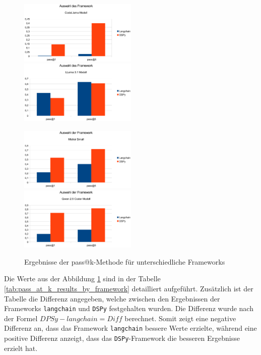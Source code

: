 \begin{figure}[!ht]
	\includegraphics[width=0.5\textwidth]{content/chapter_evaluation/images/framework_evaluation_codellama.eps}
	\includegraphics[width=0.5\textwidth]{content/chapter_evaluation/images/framework_evaluation_llama31.eps}\vspace{1cm}

	\includegraphics[width=0.5\textwidth]{content/chapter_evaluation/images/framework_evaluation_mistral-small.eps}
	\includegraphics[width=0.5\textwidth]{content/chapter_evaluation/images/framework_evaluation_qwen25-coder.eps}
	\caption{Ergebnisse der pass@k-Methode für unterschiedliche Frameworks}
	\label{img:pass_at_k_results_by_framework}
\end{figure}

Die Werte aus der Abbildung \ref{img:pass_at_k_results_by_framework} sind in der Tabelle \ref{tab:pass_at_k_results_by_framework} detailliert aufgeführt. Zusätzlich ist der Tabelle die Differenz angegeben, welche zwischen den Ergebnissen der Frameworks \texttt{langchain} und \texttt{DSPy} festgehalten wurden. Die Differenz wurde nach der Formel $DPSy - langchain = Diff$ berechnet. Somit zeigt eine negative Differenz an, dass das Framework \texttt{langchain} bessere Werte erzielte, während eine positive Differenz anzeigt, dass das \texttt{DSPy}-Framework die besseren Ergebnisse erzielt hat.

